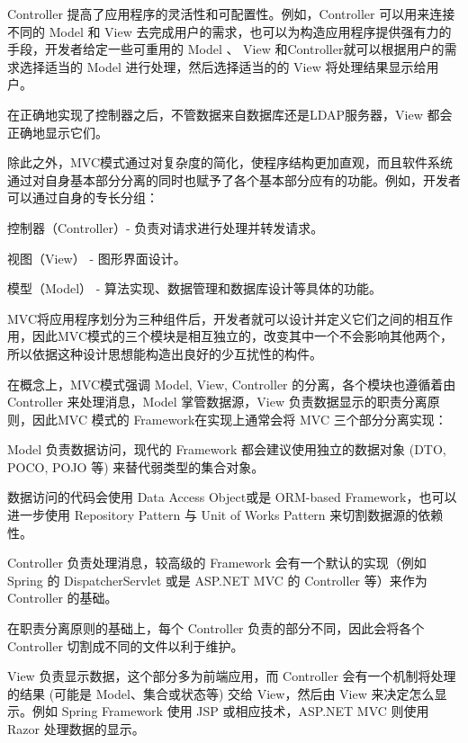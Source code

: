 Controller 提高了应用程序的灵活性和可配置性。例如，Controller 可以用来连接不同的 Model 和 View 去完成用户的需求，也可以为构造应用程序提供强有力的手段，开发者给定一些可重用的 Model 、 View 和Controller就可以根据用户的需求选择适当的 Model 进行处理，然后选择适当的的 View 将处理结果显示给用户。

在正确地实现了控制器之后，不管数据来自数据库还是LDAP服务器，View 都会正确地显示它们。

除此之外，MVC模式通过对复杂度的简化，使程序结构更加直观，而且软件系统通过对自身基本部分分离的同时也赋予了各个基本部分应有的功能。例如，开发者可以通过自身的专长分组：

\begin{compactitem}
\item 控制器（Controller）- 负责对请求进行处理并转发请求。
\item 视图（View） - 图形界面设计。
\item 模型（Model） - 算法实现、数据管理和数据库设计等具体的功能。
\end{compactitem}

MVC将应用程序划分为三种组件后，开发者就可以设计并定义它们之间的相互作用，因此MVC模式的三个模块是相互独立的，改变其中一个不会影响其他两个，所以依据这种设计思想能构造出良好的少互扰性的构件。

在概念上，MVC模式强调 Model, View, Controller 的分离，各个模块也遵循着由 Controller 来处理消息，Model 掌管数据源，View 负责数据显示的职责分离原则，因此MVC 模式的 Framework在实现上通常会将 MVC 三个部分分离实现：

\begin{compactitem}
\item Model 负责数据访问，现代的 Framework 都会建议使用独立的数据对象 (DTO, POCO, POJO 等) 来替代弱类型的集合对象。

数据访问的代码会使用 Data Access Object或是 ORM-based Framework，也可以进一步使用 Repository Pattern 与 Unit of Works Pattern 来切割数据源的依赖性。

\item Controller 负责处理消息，较高级的 Framework 会有一个默认的实现（例如Spring 的 DispatcherServlet 或是 ASP.NET MVC 的 Controller 等）来作为 Controller 的基础。

在职责分离原则的基础上，每个 Controller 负责的部分不同，因此会将各个 Controller 切割成不同的文件以利于维护。

\item View 负责显示数据，这个部分多为前端应用，而 Controller 会有一个机制将处理的结果 (可能是 Model、集合或状态等) 交给 View，然后由 View 来决定怎么显示。例如 Spring Framework 使用 JSP 或相应技术，ASP.NET MVC 则使用 Razor 处理数据的显示。


\end{compactitem}


